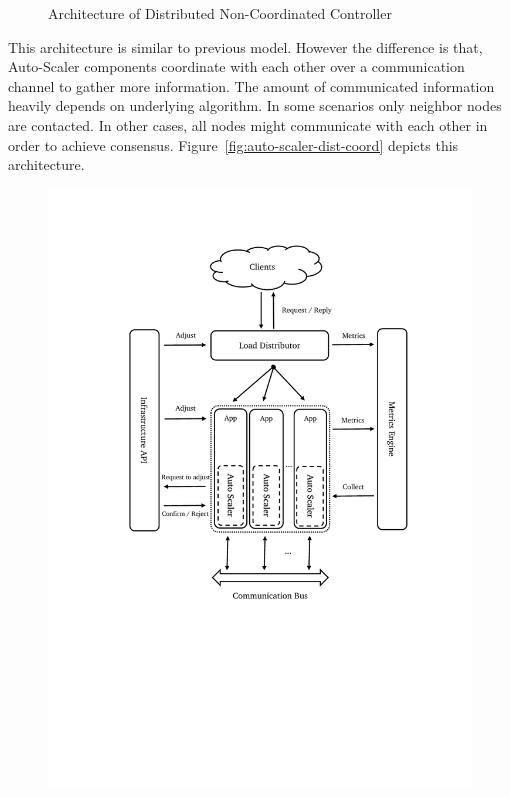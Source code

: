 \begin{description}[leftmargin=0pt]
\begin{figure}[hb]
        \centering
        \caption{Architecture of Distributed Non-Coordinated Controller}
        \label{fig:auto-scaler-dist-wo-coord}
    \end{figure}
    \clearpage
    \item[Distributed Coordinated] This architecture is similar to previous model. However the difference is that, Auto-Scaler components coordinate with each other over a communication channel to gather more information. The amount of communicated information heavily depends on underlying algorithm. In some scenarios only neighbor nodes are contacted. In other cases, all nodes might communicate with each other in order to achieve consensus. Figure~\ref{fig:auto-scaler-dist-coord} depicts this architecture.
    \begin{figure}[hb]
        \includegraphics[clip, trim=3cm 9cm 2.5cm 2.5cm]{auto-scaler-dist-coord.pdf}
        \centering

\end{figure}
\end{description}
